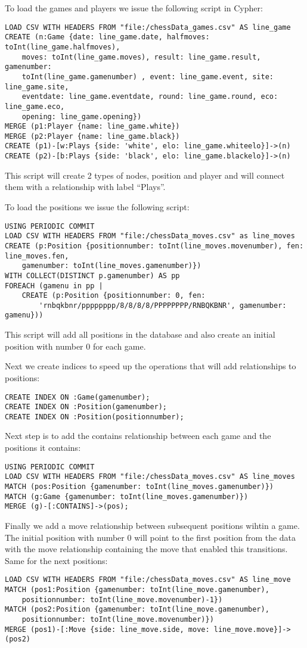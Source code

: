 \documentclass{article}
\begin{document}
To load the games and players we issue the following script in Cypher:
\begin{lstlisting}
LOAD CSV WITH HEADERS FROM "file:/chessData_games.csv" AS line_game
CREATE (n:Game {date: line_game.date, halfmoves: toInt(line_game.halfmoves), 
	moves: toInt(line_game.moves), result: line_game.result, gamenumber:
	toInt(line_game.gamenumber) , event: line_game.event, site: line_game.site,
	eventdate: line_game.eventdate, round: line_game.round, eco: line_game.eco,
	opening: line_game.opening})
MERGE (p1:Player {name: line_game.white})
MERGE (p2:Player {name: line_game.black})
CREATE (p1)-[w:Plays {side: 'white', elo: line_game.whiteelo}]->(n)
CREATE (p2)-[b:Plays {side: 'black', elo: line_game.blackelo}]->(n)
\end{lstlisting}
This script will create 2 types of nodes, position and player and will connect
them with a relationship with label ``Plays''.

To load the positions we issue the following script:
\begin{lstlisting}
USING PERIODIC COMMIT
LOAD CSV WITH HEADERS FROM "file:/chessData_moves.csv" as line_moves
CREATE (p:Position {positionnumber: toInt(line_moves.movenumber), fen: line_moves.fen,
	gamenumber: toInt(line_moves.gamenumber)})
WITH COLLECT(DISTINCT p.gamenumber) AS pp
FOREACH (gamenu in pp |
	CREATE (p:Position {positionnumber: 0, fen: 
		'rnbqkbnr/pppppppp/8/8/8/8/PPPPPPPP/RNBQKBNR', gamenumber: gamenu}))
\end{lstlisting}
This script will add all positions in the database and also create an initial
position with number 0 for each game.

Next we create indices to speed up the operations that will add relationships to
positions:
\begin{lstlisting}
CREATE INDEX ON :Game(gamenumber);
CREATE INDEX ON :Position(gamenumber);
CREATE INDEX ON :Position(positionnumber);
\end{lstlisting}

Next step is to add the contains relationship between each game and the
positions it contains:
\begin{lstlisting}
USING PERIODIC COMMIT
LOAD CSV WITH HEADERS FROM "file:/chessData_moves.csv" AS line_moves
MATCH (pos:Position {gamenumber: toInt(line_moves.gamenumber)})
MATCH (g:Game {gamenumber: toInt(line_moves.gamenumber)})
MERGE (g)-[:CONTAINS]->(pos);
\end{lstlisting}

Finally we add a move relationship between subsequent positions wihtin a game.
The initial position with number 0 will point to the first position from the
data with the move relationship containing the move that enabled this
transitions. Same for the next positions:
\begin{lstlisting}
LOAD CSV WITH HEADERS FROM "file:/chessData_moves.csv" AS line_move
MATCH (pos1:Position {gamenumber: toInt(line_move.gamenumber), 
	positionnumber: toInt(line_move.movenumber)-1})
MATCH (pos2:Position {gamenumber: toInt(line_move.gamenumber), 
	positionnumber: toInt(line_move.movenumber)})
MERGE (pos1)-[:Move {side: line_move.side, move: line_move.move}]->(pos2)
\end{lstlisting}
\end{document}
